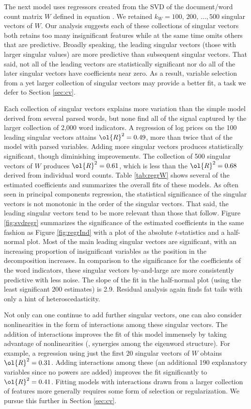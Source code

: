 \documentclass[12pt]{article}
\begin{document}
 The next model uses regressors created from the SVD of the document/word
 count matrix $W$ defined in equation .  We retained $k_W = 100,\, 200, \, \ldots, 500$ singular vectors of $W$.   Our analysis suggests each of these collections of singular vectors both retains too many insignificant features while at the same time omits others that are predictive.  Broadly speaking, the leading singular vectors (those with larger singular values) are more predictive than subsequent singular vectors.  That said, not all of the leading vectors are statistically significant nor do all of the later singular vectors have coefficients near zero.   As a result, variable selection from a yet larger collection of singular vectors may provide a better fit, a task we defer to Section \ref{sec:cv}.  
 

Each collection of singular vectors explains more variation than the simple model derived from several parsed words, but none find all of the signal captured by the larger collection of 2,000 word indicators.  A regression of log prices on the 100 leading singular vectors attains $\ol{R}^2 = 0.49$, more than twice that of the model with parsed variables.  Adding more singular vectors produces statistically significant, though diminishing improvements.  The collection of 500 singular vectors of $W$ produces $\ol{R}^2 = 0.61$, which is less than the $\ol{R}^2 = 0.68$ derived from individual word counts.  Table \ref{tab:regrW}  shows several of the estimated coefficients and summarizes the overall fits of these models.  As often seen in principal components regression, the statistical significance of the singular vectors is not monotonic in the order of the singular vectors. That said, the leading singular vectors tend to be more relevant than those that follow. Figure \ref{fig:svdregr} summarizes the significance of the estimated coefficients in the same fashion as Figure \ref{fig:regrInd} with a plot of the absolute $t$-statistics and a half-normal plot. Most of the main leading singular vectors are significant, with an increasing proportion of insignificant variables as the position in the decomposition increases.  In comparison to the significance for the coefficients of the word indicators, these singular vectors by-and-large are more consistently predictive with less noise.  The slope of the fit in the half-normal plot (using the least significant 200 estimates) is 2.9.  Residual analysis again finds fat tails with only a hint of heteroscedasticity.
 
 
 Not only can one continue to add further singular vectors, one can also consider nonlinearities in the form of interactions among these singular vectors.  The addition of interactions improves the fit of this model immensely by taking advantage of nonlinearities (\ie, synergies among the eigenword structure).  For example, a regression using just the first 20 singular vectors of $W$ obtains $\ol{R}^2 = 0.31$.  Adding interactions among these (an additional 190 explanatory variables since no powers are added) improves the fit significantly to $\ol{R}^2 = 0.41$.  Fitting models with interactions drawn from a larger collection of features more generally requires some form of selection or regularization.  We pursue this further in Section \ref{sec:cv}.
 
\end{document}
